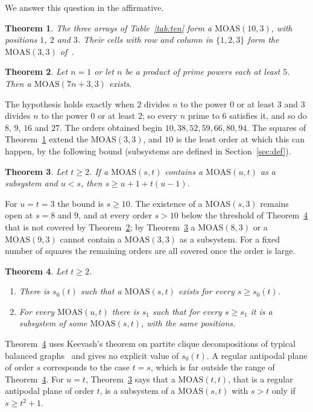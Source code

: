 \documentclass[11pt]{amsart}
\newtheorem{theorem}{Theorem}\newtheorem{lemma}[theorem]{Lemma}
\theoremstyle{definition}\newtheorem{definition}[theorem]{Definition}
\theoremstyle{remark}\newtheorem{remark}[theorem]{Remark}
\newcommand{\MOAS}{\mathrm{MOAS}}
\begin{document}
We answer this question in the affirmative.

\begin{theorem}\label{thm:ten}
The three arrays of Table~\ref{tab:ten} form a $\MOAS(10,3)$, with positions $1$, $2$ and $3$. Their cells with
row and column in $\{1,2,3\}$ form the $\MOAS(3,3)$ of~\cite[Example~2.18]{ABW}.
\end{theorem}

\begin{theorem}\label{thm:family}
Let $n=1$ or let $n$ be a product of prime powers each at least $5$. Then a $\MOAS(7n+3,3)$ exists.
\end{theorem}

The hypothesis holds exactly when $2$ divides $n$ to the power $0$ or at least $3$ and $3$ divides $n$ to the power
$0$ or at least $2$; so every $n$ prime to $6$ satisfies it, and so do $8$, $9$, $16$ and $27$. The orders obtained
begin $10,38,52,59,66,80,94$. The squares of Theorem~\ref{thm:ten} extend the $\MOAS(3,3)$, and $10$ is the
least order at which this can happen, by the following bound (subsystems are defined in Section~\ref{sec:def}).

\begin{theorem}\label{thm:bound}
Let $t\ge2$. If a $\MOAS(s,t)$ contains a $\MOAS(u,t)$ as a subsystem and $u<s$, then $s\ge u+1+t(u-1)$.
\end{theorem}

For $u=t=3$ the bound is $s\ge10$. The existence of a $\MOAS(s,3)$ remains open at $s=8$ and $9$, and at every
order $s>10$ below the threshold of Theorem~\ref{thm:large} that is not covered by Theorem~\ref{thm:family}; by
Theorem~\ref{thm:bound} a $\MOAS(8,3)$ or a $\MOAS(9,3)$ cannot contain a $\MOAS(3,3)$ as a subsystem. For a
fixed number of squares the remaining orders are all covered once the order is large.

\begin{theorem}\label{thm:large}
Let $t\ge2$.
\begin{enumerate}
\item[(a)] There is $s_0(t)$ such that a $\MOAS(s,t)$ exists for every $s\ge s_0(t)$.
\item[(b)] For every $\MOAS(u,t)$ there is $s_1$ such that for every $s\ge s_1$ it is a subsystem of some $\MOAS(s,t)$,
with the same positions.
\end{enumerate}
\end{theorem}

Theorem~\ref{thm:large} uses Keevash's theorem on partite clique decompositions of typical balanced graphs~\cite{KeevashCD,KeevashII}
and gives no explicit value of $s_0(t)$. A regular antipodal plane of order $s$ corresponds to the case $t=s$, which
is far outside the range of Theorem~\ref{thm:large}. For $u=t$, Theorem~\ref{thm:bound} says that a
$\MOAS(t,t)$, that is a regular antipodal plane of order $t$, is a subsystem of a $\MOAS(s,t)$ with $s>t$ only if
$s\ge t^2+1$.
\end{document}
